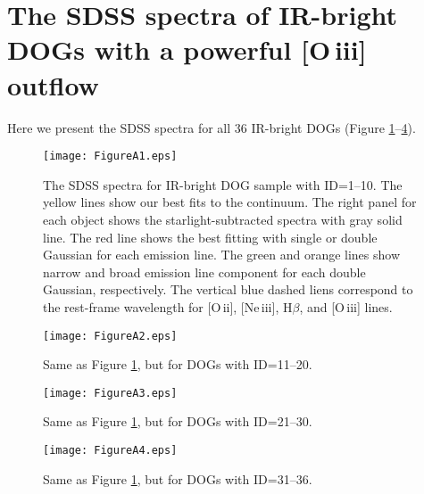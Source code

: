 \documentclass[twocolumn]{aastex6}
\newcommand{\oiii}{[O{\,\sc iii}]\,\,}
\begin{document}
\appendix
\section{The SDSS spectra of IR-bright DOGs with a powerful \oiii outflow}
\label{spectra_all}
Here we present the SDSS spectra for all 36 IR-bright DOGs (Figure \ref{spectra}--\ref{spectra4}).
 
   \begin{figure}
   \centering
   \texttt{[image: FigureA1.eps]}
   \caption{The SDSS spectra for IR-bright DOG sample with ID=1--10. The yellow lines show our best fits to the continuum. The right panel for each object shows the starlight-subtracted spectra with gray solid line. The red line shows the best fitting with single or double Gaussian for each emission line. The green and orange lines show narrow and broad emission line component for each double Gaussian, respectively. The vertical blue dashed liens correspond to the rest-frame wavelength for [O{\,\sc ii}], [Ne{\,\sc iii}], H$\beta$, and [O{\,\sc iii}] lines.}
   \label{spectra}
   \end{figure}  
    
   \begin{figure}
   \centering
   \texttt{[image: FigureA2.eps]}
   \caption{Same as Figure \ref{spectra}, but for DOGs with ID=11--20.}
   \label{spectra2}
   \end{figure}   

   \begin{figure}
   \centering
   \texttt{[image: FigureA3.eps]}
   \caption{Same as Figure \ref{spectra}, but for DOGs with ID=21--30.}
   \label{spectra3}
   \end{figure}   
   
   \begin{figure}
   \centering
   \texttt{[image: FigureA4.eps]}
   \caption{Same as Figure \ref{spectra}, but for DOGs with ID=31--36.}
   \label{spectra4}
   \end{figure}   
   
\end{document}
